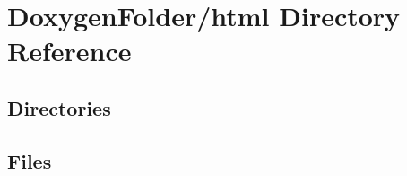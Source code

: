 \section{Doxygen\+Folder/html Directory Reference}
\label{dir_deabe37886449192ef6d5c20d5b75d1a}
\subsection*{Directories}
\begin{DoxyCompactItemize}
\end{DoxyCompactItemize}
\subsection*{Files}
\begin{DoxyCompactItemize}
\end{DoxyCompactItemize}
